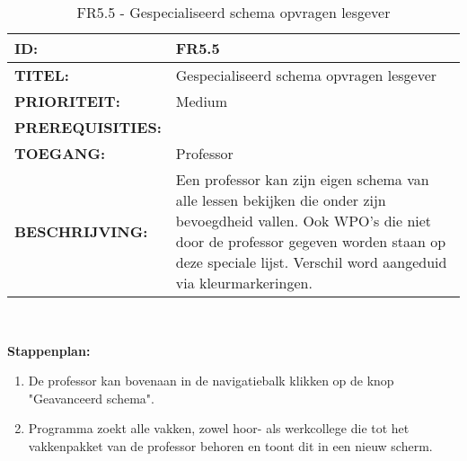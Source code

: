  
\noindent\begin{table}[H]
            \begin{tabular}{l | p{10cm}}
                \textbf{ID:} & FR5.5 \\ \hline
                \textbf{TITEL:} & Gespecialiseerd schema opvragen lesgever\\ \hline
                \textbf{PRIORITEIT:} &  Medium \\ \hline
                \textbf{PREREQUISITIES:} & \\ \hline
                \textbf{TOEGANG:} & Professor \\ \hline
                \textbf{BESCHRIJVING:} & Een professor kan zijn eigen schema van alle lessen bekijken die onder zijn bevoegdheid vallen. Ook WPO's die niet door de professor gegeven worden staan op deze speciale lijst. Verschil word aangeduid via kleurmarkeringen. \\ 
            \end{tabular}\\
            \caption{FR5.5 - Gespecialiseerd schema opvragen lesgever}
            \label{tab:FR5.5 - Gespecializeerd schema opvragen lesgever}
        \end{table}
        
\textbf{Stappenplan:}
\begin{enumerate}
\item De professor kan bovenaan in de navigatiebalk klikken op de knop "Geavanceerd schema".
\item Programma zoekt alle vakken, zowel hoor- als werkcollege die tot het vakkenpakket van de professor behoren en toont dit in een nieuw scherm.
\end{enumerate}